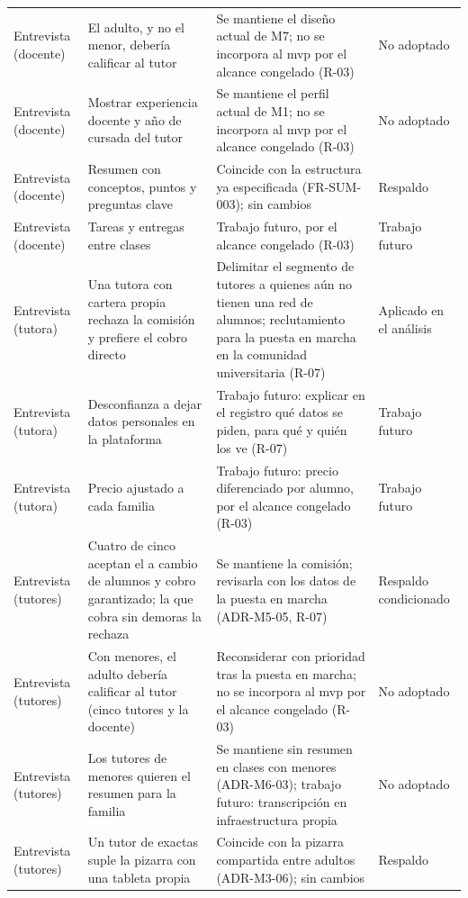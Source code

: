 {\begin{xltabular}{\textwidth}{>{\raggedright\arraybackslash}p{2.1cm} L L >{\raggedright\arraybackslash}p{2.6cm}}
        Entrevista (docente) & El adulto, y no el menor, debería calificar al tutor & Se mantiene el diseño actual de M7; no se incorpora al \gls{mvp} por el alcance congelado (R-03) & No adoptado \\
        Entrevista (docente) & Mostrar experiencia docente y año de cursada del tutor & Se mantiene el perfil actual de M1; no se incorpora al \gls{mvp} por el alcance congelado (R-03) & No adoptado \\
        Entrevista (docente) & Resumen con conceptos, puntos y preguntas clave & Coincide con la estructura ya especificada (FR-SUM-003); sin cambios & Respaldo \\
        Entrevista (docente) & Tareas y entregas entre clases & Trabajo futuro, por el alcance congelado (R-03) & Trabajo futuro \\
        Entrevista (tutora) & Una tutora con cartera propia rechaza la comisión y prefiere el cobro directo & Delimitar el segmento de tutores a quienes aún no tienen una red de alumnos; reclutamiento para la puesta en marcha en la comunidad universitaria (R-07) & Aplicado en el análisis \\
        Entrevista (tutora) & Desconfianza a dejar datos personales en la plataforma & Trabajo futuro: explicar en el registro qué datos se piden, para qué y quién los ve (R-07) & Trabajo futuro \\
        Entrevista (tutora) & Precio ajustado a cada familia & Trabajo futuro: precio diferenciado por alumno, por el alcance congelado (R-03) & Trabajo futuro \\
        Entrevista (tutores) & Cuatro de cinco aceptan el \comision{} a cambio de alumnos y cobro garantizado; la que cobra sin demoras la rechaza & Se mantiene la comisión; revisarla con los datos de la puesta en marcha (ADR-M5-05, R-07) & Respaldo condicionado \\
        Entrevista (tutores) & Con menores, el adulto debería calificar al tutor (cinco tutores y la docente) & Reconsiderar con prioridad tras la puesta en marcha; no se incorpora al \gls{mvp} por el alcance congelado (R-03) & No adoptado \\
        Entrevista (tutores) & Los tutores de menores quieren el resumen para la familia & Se mantiene sin resumen en clases con menores (ADR-M6-03); trabajo futuro: transcripción en infraestructura propia & No adoptado \\
        Entrevista (tutores) & Un tutor de exactas suple la pizarra con una tableta propia & Coincide con la pizarra compartida entre adultos (ADR-M3-06); sin cambios & Respaldo \\

\end{xltabular}}
